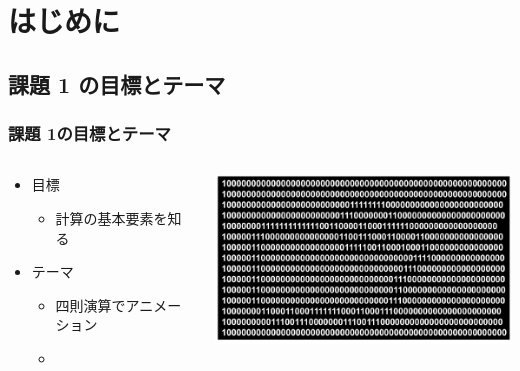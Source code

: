 \section{はじめに}
%
%
\subsection{課題 1 の目標とテーマ}
\begin{frame}
\frametitle{課題 1の目標とテーマ}
  \begin{columns}
    \begin{column}{0.6\textwidth}
      \begin{itemize}
\item 目標
        \begin{itemize}
\item 計算の基本要素を知る
        \end{itemize}
\item テーマ
        \begin{itemize}
\item 四則演算でアニメーション
\item {}
        \end{itemize}
      \end{itemize}
    \end{column}
    \begin{column}{0.4\textwidth}
\includegraphics[scale=0.6]{./Figure/sheep-fixed.pdf}
    \end{column}
  \end{columns}
\end{frame}
